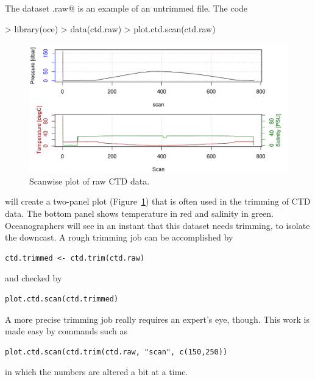 \documentclass{article}
\begin{document}
The dataset \verb@ctd.raw@ is an example of an untrimmed file.  The code
\begin{Schunk}
\begin{Sinput}
> library(oce)
> data(ctd.raw)
> plot.ctd.scan(ctd.raw)
\end{Sinput}
\end{Schunk}
\begin{figure}
\begin{center}
\includegraphics{oce-ctdrawfig}
\end{center}
\caption{Scanwise plot of raw CTD data.}
\label{fig:ctdraw}
\end{figure}
\noindent will create a two-panel plot (Figure~\ref{fig:ctdraw}) that is often used in the
trimming of CTD data. The bottom panel shows temperature in red and salinity in green.
Oceanographers will see in an instant that this dataset needs trimming, to isolate the downcast.  A rough trimming job can be accomplished by
\begin{verbatim}
ctd.trimmed <- ctd.trim(ctd.raw)
\end{verbatim}
and checked by
\begin{verbatim}
plot.ctd.scan(ctd.trimmed)
\end{verbatim}	
A more precise trimming job really requires an expert's eye, though.  This work
is made easy by commands such as
\begin{verbatim}
plot.ctd.scan(ctd.trim(ctd.raw, "scan", c(150,250))
\end{verbatim}
in which the numbers are altered a bit at a time.
\end{document}
